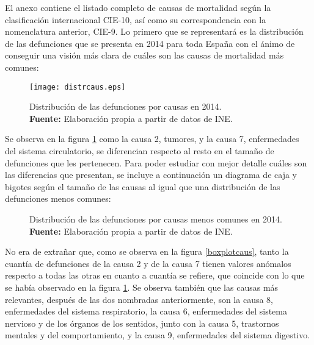 \documentclass{article}
\begin{document}
El anexo contiene el listado completo de causas de mortalidad según la clasificación internacional CIE-10, así como su correspondencia con la nomenclatura anterior, CIE-9. Lo primero que se representará es la distribución de las defunciones que se presenta en 2014 para toda España con el ánimo de conseguir una visión más clara de cuáles son las causas de mortalidad más comunes:

\begin{figure}[H]
\centering
\texttt{[image: distrcaus.eps]}
\caption{\centering Distribución de las defunciones por causas en 2014. \\ \textbf{Fuente:} Elaboración propia a partir de datos de INE.}
\label{distrcaus}
\end{figure}

Se observa en la figura \ref{distrcaus} como la causa 2, tumores, y la causa 7, enfermedades del sistema circulatorio, se diferencian respecto al resto en el tamaño de defunciones que les pertenecen. Para poder estudiar con mejor detalle cuáles son las diferencias que presentan, se incluye a continuación un diagrama de caja y bigotes según el tamaño de las causas al igual que una distribución de las defunciones menos comunes:


\begin{figure}[H]
 \centering
 \caption{\centering Distribución de las defunciones por causas menos comunes en 2014. \\ \textbf{Fuente:} Elaboración propia a partir de datos de INE.}
 \label{f:animales}
\end{figure}


No era de extrañar que, como se observa en la figura \ref{boxplotcaus}, tanto la cuantía de defunciones de la causa 2 y de la causa 7 tienen valores anómalos respecto a todas las otras en cuanto a cuantía se refiere, que coincide con lo que se había observado en la figura \ref{distrcaus}. 
Se observa también que las causas más relevantes, después de las dos nombradas anteriormente, son la causa 8, enfermedades del sistema respiratorio, la causa 6, enfermedades del sistema nervioso y de los órganos de los sentidos, junto con la causa 5, trastornos mentales y del comportamiento, y la causa 9, enfermedades del sistema digestivo.
\end{document}
